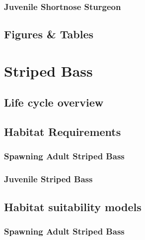 \documentclass[
]{book}
\begin{document}
\hypertarget{juvenile-shortnose-sturgeon-1}{%
\subsection{Juvenile Shortnose Sturgeon}\label{juvenile-shortnose-sturgeon-1}}

\hypertarget{figures-tables-8}{%
\section{Figures \& Tables}\label{figures-tables-8}}

\hypertarget{striped-bass}{%
\chapter{Striped Bass}\label{striped-bass}}

\hypertarget{life-cycle-overview-9}{%
\section{Life cycle overview}\label{life-cycle-overview-9}}

\hypertarget{habitat-requirements-9}{%
\section{Habitat Requirements}\label{habitat-requirements-9}}

\hypertarget{spawning-adult-striped-bass}{%
\subsection{Spawning Adult Striped Bass}\label{spawning-adult-striped-bass}}

\hypertarget{juvenile-striped-bass}{%
\subsection{Juvenile Striped Bass}\label{juvenile-striped-bass}}

\hypertarget{habitat-suitability-models-9}{%
\section{Habitat suitability models}\label{habitat-suitability-models-9}}

\hypertarget{spawning-adult-striped-bass-1}{%
\subsection{Spawning Adult Striped Bass}\label{spawning-adult-striped-bass-1}}
\end{document}
